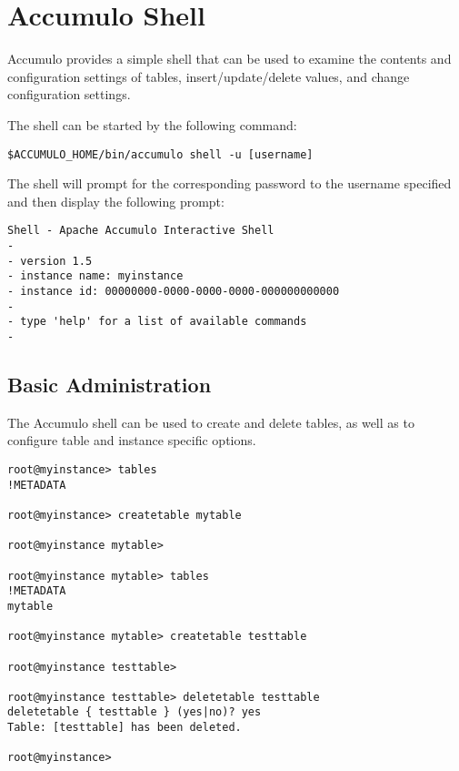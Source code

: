
%
%

\chapter{Accumulo Shell} 
Accumulo provides a simple shell that can be used to examine the contents and
configuration settings of tables, insert/update/delete values, and change
configuration settings. 

The shell can be started by the following command:

\small
\begin{verbatim}
$ACCUMULO_HOME/bin/accumulo shell -u [username]
\end{verbatim}

\normalsize

The shell will prompt for the corresponding password to the username specified
and then display the following prompt:

\small
\begin{verbatim}
Shell - Apache Accumulo Interactive Shell
-
- version 1.5
- instance name: myinstance
- instance id: 00000000-0000-0000-0000-000000000000
-
- type 'help' for a list of available commands
-
\end{verbatim}
\normalsize

\section{Basic Administration}

The Accumulo shell can be used to create and delete tables, as well as to configure
table and instance specific options.

\small
\begin{verbatim}
root@myinstance> tables
!METADATA

root@myinstance> createtable mytable

root@myinstance mytable>

root@myinstance mytable> tables
!METADATA
mytable

root@myinstance mytable> createtable testtable

root@myinstance testtable>

root@myinstance testtable> deletetable testtable
deletetable { testtable } (yes|no)? yes
Table: [testtable] has been deleted. 

root@myinstance>
\end{verbatim}
\normalsize

